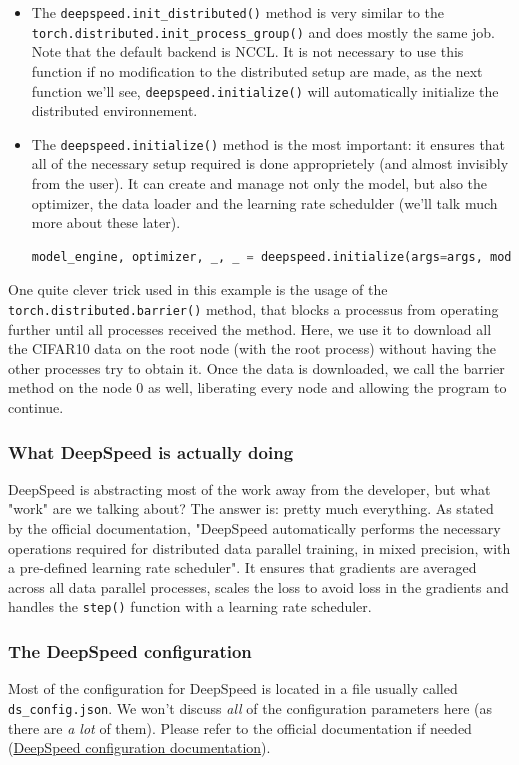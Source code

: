 \documentclass{article}
\begin{document}
\begin{itemize}
  \item The \lstinline{deepspeed.init_distributed()} method is very similar to the \lstinline{torch.distributed.init_process_group()} and does mostly the same job. Note that the default backend is NCCL. It is not necessary to use this function if no modification to the distributed setup are made, as the next function we'll see, \lstinline{deepspeed.initialize()} will automatically initialize the distributed environnement.
  \item The \lstinline{deepspeed.initialize()} method is the most important: it ensures that all of the necessary setup required is done approprietely (and almost invisibly from the user). It can create and manage not only the model, but also the optimizer, the data loader and the learning rate schedulder (we'll talk much more about these later).
  \begin{lstlisting}[language=Python]
model_engine, optimizer, _, _ = deepspeed.initialize(args=args, model=model, model_parameters=model.parameters())
  \end{lstlisting}
\end{itemize}
One quite clever trick used in this example is the usage of the \lstinline{torch.distributed.barrier()} method, that blocks a processus from operating further until all processes received the method. Here, we use it to download all the CIFAR10 data on the root node (with the root process) without having the other processes try to obtain it. Once the data is downloaded, we call the barrier method on the node 0 as well, liberating every node and allowing the program to continue.

\subsubsection{What DeepSpeed is actually doing}
DeepSpeed is abstracting most of the work away from the developer, but what "work" are we talking about? The answer is: pretty much everything. As stated by the official documentation, "DeepSpeed automatically performs the necessary operations required for distributed data parallel training, in mixed precision, with a pre-defined learning rate scheduler". It ensures that gradients are averaged across all data parallel processes, scales the loss to avoid loss in the gradients and handles the \lstinline{step()} function with a learning rate scheduler.

\subsubsection{The DeepSpeed configuration}
Most of the configuration for DeepSpeed is located in a file usually called \lstinline{ds_config.json}. We won't discuss \textit{all} of the configuration parameters here (as there are \textit{a lot} of them). Please refer to the official documentation if needed (\href{https://www.deepspeed.ai/docs/config-json/}{DeepSpeed configuration documentation}).
\end{document}
